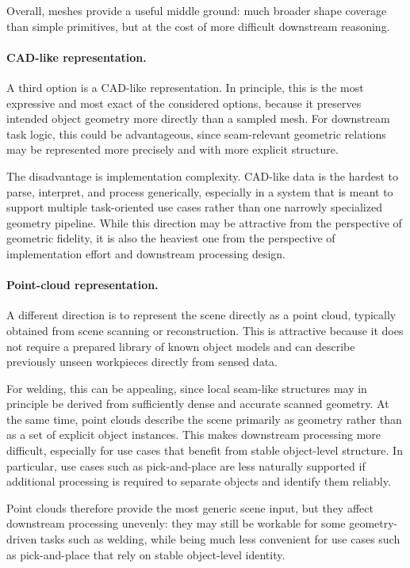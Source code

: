 Overall, meshes provide a useful middle ground: much broader shape coverage than simple primitives, but at the cost of more difficult downstream reasoning.

\paragraph{CAD-like representation.}
A third option is a CAD-like representation. In principle, this is the most expressive and most exact of the considered options, because it preserves intended object geometry more directly than a sampled mesh. For downstream task logic, this could be advantageous, since seam-relevant geometric relations may be represented more precisely and with more explicit structure.

The disadvantage is implementation complexity. CAD-like data is the hardest to parse, interpret, and process generically, especially in a system that is meant to support multiple task-oriented use cases rather than one narrowly specialized geometry pipeline. While this direction may be attractive from the perspective of geometric fidelity, it is also the heaviest one from the perspective of implementation effort and downstream processing design.

\paragraph{Point-cloud representation.}
A different direction is to represent the scene directly as a point cloud, typically obtained from scene scanning or reconstruction. This is attractive because it does not require a prepared library of known object models and can describe previously unseen workpieces directly from sensed data.

For welding, this can be appealing, since local seam-like structures may in principle be derived from sufficiently dense and accurate scanned geometry. At the same time, point clouds describe the scene primarily as geometry rather than as a set of explicit object instances. This makes downstream processing more difficult, especially for use cases that benefit from stable object-level structure. In particular, use cases such as pick-and-place are less naturally supported if additional processing is required to separate objects and identify them reliably.

Point clouds therefore provide the most generic scene input, but they affect downstream processing unevenly: they may still be workable for some geometry-driven tasks such as welding, while being much less convenient for use cases such as pick-and-place that rely on stable object-level identity.

